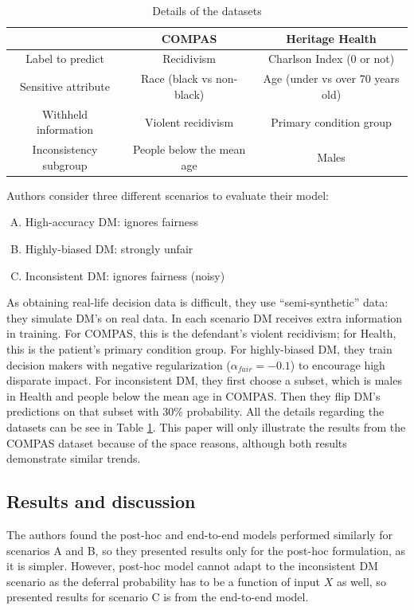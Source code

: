 \documentclass[11pt,a4paper,final]{article}
\begin{document}
\begin{table}[ht]
    \centering
    \begin{tabular}{|c|c|c|}
    \hline 
     & COMPAS & Heritage Health \\ 
    \hline 
    Label to predict & Recidivism & Charlson Index (0 or not) \\ 
    \hline 
    Sensitive attribute & Race (black vs non-black) & Age (under vs over 70 years old) \\ 
    \hline 
    Withheld information & Violent recidivism & Primary condition group \\ 
    \hline 
    Inconsistency subgroup & People below the mean age & Males \\ 
    \hline 
    \end{tabular}
    \caption{Details of the datasets}
    \label{tab:pr-datasets}
\end{table}

Authors consider three different scenarios to evaluate their model:
\begin{enumerate}[A)]
    \item High-accuracy DM: ignores fairness
    \item Highly-biased DM: strongly unfair
    \item Inconsistent DM: ignores fairness (noisy)
\end{enumerate}
\par As obtaining real-life decision data is difficult, they use ``semi-synthetic'' data: they simulate DM's on real data. In each scenario DM receives extra information in training. For COMPAS, this is the defendant’s violent recidivism; for Health, this is the patient’s primary condition group. For highly-biased DM, they train decision makers with negative regularization ($\alpha_{fair} = -0.1$) to encourage high disparate impact. For inconsistent DM, they first choose a subset, which is males in Health and people below the mean age in COMPAS. Then they flip DM’s predictions  on that subset with 30\% probability. All the details regarding the datasets can be see in Table \ref{tab:pr-datasets}. This paper will only illustrate the results from the COMPAS dataset because of the space reasons, although both results demonstrate similar trends.

\subsection{Results and discussion}
The authors found the post-hoc and end-to-end models performed similarly for scenarios A and B, so they presented results only for the post-hoc formulation, as it is simpler. However, post-hoc model cannot adapt to the inconsistent DM scenario as the deferral probability has to be a function of input $X$ as well, so presented results for scenario C is from the end-to-end model.
\end{document}
